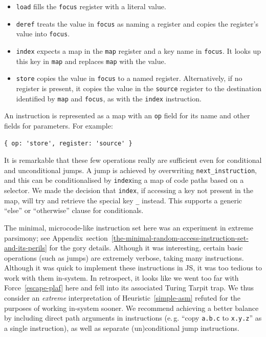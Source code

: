 \documentclass[ twoside,openright,titlepage,numbers=noenddot,headinclude,footinclude,cleardoublepage=empty,abstract=on,
                BCOR=5mm,paper=a4,fontsize=11pt
                ]{scrreprt}
\newcommand{\eg}{e.\,g.}
\newcommand{\joel}[1]{}
\providecommand{\tightlist}{}\newenvironment{longtable}[2]{\begin{tabular}}{\end{tabular}}
\theoremstyle{definition}
\begin{document}
\begin{itemize}
\tightlist
\item
  \texttt{load} fills the \texttt{focus} register with a literal value.
  \joel{For example, `load reg1` causes the `focus` register to contain the string `reg1`.}
\item
  \texttt{deref} treats the value in \texttt{focus} as naming a register
  and copies the register's value into \texttt{focus}.
  \joel{For example, if `reg1` contained the value `42`, `deref` would store `42` in `focus`.}
\item
  \texttt{index} expects a map in the \texttt{map} register and a key
  name in \texttt{focus}. It looks up this key in \texttt{map} and
  replaces \texttt{map} with the value.
  \joel{For example, if the value in `map` contains a key `foo` with value `42` and `focus` contains `foo`, `index` will store `42` in `focus`.}
\item
  \texttt{store} copies the value in \texttt{focus} to a named register.
  Alternatively, if no register is present, it copies the value in the
  \texttt{source} register to the destination identified by \texttt{map}
  and \texttt{focus}, as with the \texttt{index} instruction.
\end{itemize}

An instruction is represented as a map with an \texttt{op} field for its
name and other fields for parameters. For example:

\begin{verbatim}
{ op: 'store', register: 'source' }
\end{verbatim}

It is remarkable that these few operations really are sufficient even
for conditional and unconditional jumps. A jump is achieved by
overwriting \texttt{next\_instruction}, and this can be conditionalised
by \texttt{index}ing a map of code paths based on a selector. We made
the decision that \texttt{index}, if accessing a key not present in the
map, will try and retrieve the special key \texttt{\_} instead. This
supports a generic ``else'' or ``otherwise'' clause for conditionals.

The minimal, microcode-like instruction set here was an experiment in
extreme parsimony; see
Appendix~section~\ref{the-minimal-random-access-instruction-set-and-its-perils}
for the gory details. Although it was interesting, certain basic
operations (such as jumps) are extremely verbose, taking many
instructions. Although it was quick to implement these instructions in
\ac{JS}, it was too tedious to work with them in-system. In retrospect,
it looks like we went too far with Force~\ref{escape-plaf} here and fell
into its associated Turing Tarpit trap. We thus consider an
\emph{extreme} interpretation of Heuristic~\ref{simple-asm} refuted for
the purposes of working in-system sooner. We recommend achieving a
better balance by including direct path arguments in instructions (\eg{}
``copy \texttt{a.b.c} to \texttt{x.y.z}'' as a single instruction), as
well as separate (un)conditional jump instructions.
\end{document}
